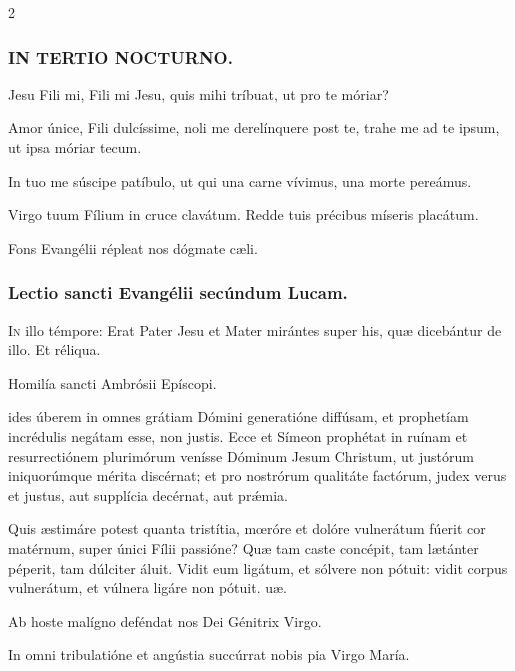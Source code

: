 \documentclass[9pt,twoside]{extarticle}
\begin{document}
\begin{multicols}{2}
\subsubsection*{\center \textsc{IN TERTIO NOCTURNO.}}
\begin{tightlist}{}
\item {} Jesu Fili mi, Fili mi Jesu, quis mihi tríbuat, ut pro te móriar?
\item {} Amor únice, Fili dulcíssime, noli me derelínquere post te, trahe me ad te ipsum, ut ipsa móriar tecum.
\item {} In tuo me súscipe patíbulo, ut qui una carne vívimus, una morte pereámus.
\item {} Virgo tuum Fílium in cruce clavátum.  Redde tuis précibus míseris placátum. 
\item {\small {} Fons Evangélii répleat nos dógmate cæli.}
\end{tightlist}

\subsubsection*{\center Lectio sancti Evangélii secúndum Lucam.}
\begin{center}\end{center}
\lettrine{I}n illo témpore: Erat Pater Jesu et Mater mirántes super his, quæ dicebántur de illo. Et réliqua.

\begin{center}Homilía sancti Ambrósii Epíscopi.\\
\end{center}
ides úberem in omnes grátiam Dómini generatióne diffúsam, et prophetíam incrédulis negátam esse, non justis. Ecce et Símeon prophétat in ruínam et resurrectiónem plurimórum venísse Dóminum Jesum Christum, ut justórum iniquorúmque mérita discérnat; et pro nostrórum qualitáte factórum, judex verus et justus, aut supplícia decérnat, aut prǽmia.

\begin{tightlist}{}
\item {} Quis æstimáre potest quanta tristítia, mœróre et dolóre vulnerátum fúerit cor matérnum, super únici Fílii passióne? \textred{*} Quæ tam caste concépit, tam lætánter péperit, tam dúlciter áluit.  Vidit eum ligátum, et sólvere non pótuit: vidit corpus vulnerátum, et vúlnera ligáre non pótuit. uæ.
\item {\small {} Ab hoste malígno deféndat nos Dei Génitrix Virgo.}
\item {}
\item {\small {} In omni tribulatióne et angústia succúrrat nobis pia Virgo María.}
\end{tightlist}


\end{multicols}
\end{document}
